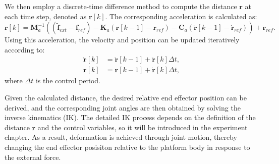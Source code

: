 We then employ a discrete-time difference method to compute the distance $\boldsymbol{r}$ at each time step, denoted as $\boldsymbol{r}[k]$. The corresponding acceleration is calculated as:
\begin{equation}
\label{eq:difference method1}
\boldsymbol{\ddot{r}}[k]=\boldsymbol{M}^{-1}_a(({\boldsymbol{\tilde{f}}_{ext}}-\boldsymbol{f}_{ref})-\boldsymbol{K}_a(\boldsymbol{r}[k-1] - \boldsymbol{r}_{ref})-\boldsymbol{C}_a(\boldsymbol{\dot{r}}[k-1]-\boldsymbol{\dot{r}}_{ref}))+\boldsymbol{\ddot{r}}_{ref}.
\end{equation}
Using this acceleration, the velocity and position can be updated iteratively according to:
\begin{subequations}
\label{eq:difference method2}
\begin{align}
\boldsymbol{\dot{r}}[k]&=\boldsymbol{\dot{r}}[k-1]+\boldsymbol{\ddot{r}}[k]\Delta t, \\[2pt]
\boldsymbol{r}[k]&=\boldsymbol{r}[k-1]+\boldsymbol{\dot{r}}[k]\Delta t,
\end{align}
\end{subequations}
where $\Delta t$ is the control period.


Given the calculated distance, the desired relative end effector position can be derived, and the corresponding joint angles are then obtained by solving the inverse kinematics (IK). The detailed IK process depends on the definition of the distance $\boldsymbol{r}$ and the control variables, so it will be introduced in the experiment chapter. As a result, deformation is achieved through joint motion, thereby changing the end effector posisiton relative to the platform body in response to the external force.





